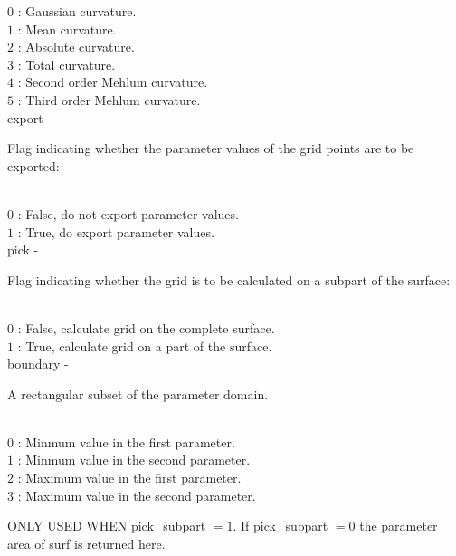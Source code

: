         \>\>\>\> $0$  \> : Gaussian curvature.\\
        \>\>\>\> $1$  \> : Mean curvature.\\
        \>\>\>\> $2$  \> : Absolute curvature.\\
        \>\>\>\> $3$  \> : Total curvature.\\
        \>\>\>\> $4$  \> : Second order Mehlum curvature.\\
        \>\>\>\> $5$  \> : Third order Mehlum curvature.\\
        \>\>    {\fov export}\> - \>  \begin{minipg2}
                     Flag indicating whether the parameter values
                            of the grid points are to be exported:
                               \end{minipg2}\\[0.8ex]
        \>\>\>\> $0$  \> : False, do not export parameter values.\\
        \>\>\>\> $1$  \> : True, do export parameter values.\\
        \>\>    {\fov pick}\> - \>  \begin{minipg2}
                     Flag indicating whether the grid is to be
                            calculated on a subpart of the surface:
                               \end{minipg2}\\[0.8ex]
        \>\>\>\> $0$  \> : False, calculate grid on the complete surface.\\
        \>\>\>\> $1$  \> : True, calculate grid on a part of the surface.\\
        \>\>    {\fov boundary}\> - \>  \begin{minipg2}
                     A rectangular subset of the parameter domain.
                               \end{minipg2}\\[0.8ex]
        \>\>\>\> $0$  \> : Minmum value in the first parameter.\\
        \>\>\>\> $1$  \> : Minmum value in the second parameter.\\
        \>\>\>\> $2$  \> : Maximum value in the first parameter.\\
        \>\>\>\> $3$  \> : Maximum value in the second parameter.\\
        \>\>\>\> \begin{minipg2}
                            ONLY USED WHEN {\fov pick\_subpart} $= 1$.
                            If {\fov pick\_subpart} $= 0$
                            the parameter area of surf is returned here.
                               \end{minipg2}\\[0.8ex]
